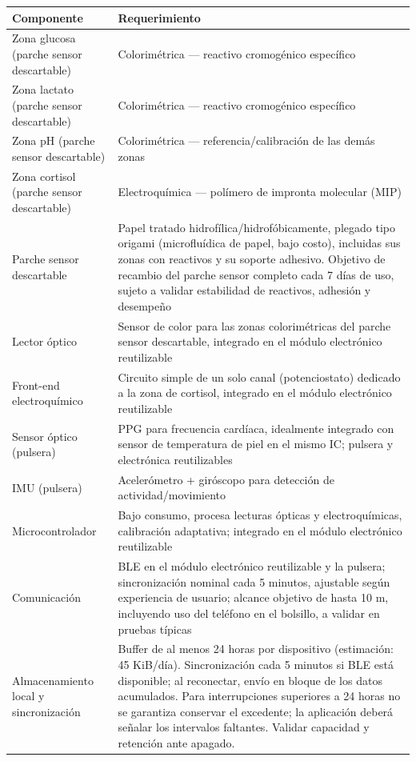 {\small
\renewcommand{\arraystretch}{1.2}
\noindent\begin{tabularx}{\textwidth}{|>{\raggedright\arraybackslash}p{}|>{\raggedright\arraybackslash}X|}
\hline
\textbf{Componente} & \textbf{Requerimiento} \\
\hline
Zona glucosa (parche sensor descartable) & Colorimétrica --- reactivo cromogénico específico \\
\hline
Zona lactato (parche sensor descartable) & Colorimétrica --- reactivo cromogénico específico \\
\hline
Zona pH (parche sensor descartable) & Colorimétrica --- referencia/calibración de las demás zonas \\
\hline
Zona cortisol (parche sensor descartable) & Electroquímica --- polímero de impronta molecular (MIP) \\
\hline
Parche sensor descartable & Papel tratado hidrofílica/hidrofóbicamente, plegado tipo origami (microfluídica de papel, bajo costo), incluidas sus zonas con reactivos y su soporte adhesivo. Objetivo de recambio del parche sensor completo cada 7 días de uso, sujeto a validar estabilidad de reactivos, adhesión y desempeño \\
\hline
Lector óptico & Sensor de color para las zonas colorimétricas del parche sensor descartable, integrado en el módulo electrónico reutilizable \\
\hline
Front-end electroquímico & Circuito simple de un solo canal (potenciostato) dedicado a la zona de cortisol, integrado en el módulo electrónico reutilizable \\
\hline
Sensor óptico (pulsera) & PPG para frecuencia cardíaca, idealmente integrado con sensor de temperatura de piel en el mismo IC; pulsera y electrónica reutilizables \\
\hline
IMU (pulsera) & Acelerómetro + giróscopo para detección de actividad/movimiento \\
\hline
Microcontrolador & Bajo consumo, procesa lecturas ópticas y electroquímicas, calibración adaptativa; integrado en el módulo electrónico reutilizable \\
\hline
Comunicación & BLE en el módulo electrónico reutilizable y la pulsera; sincronización nominal cada 5 minutos, ajustable según experiencia de usuario; alcance objetivo de hasta 10 m, incluyendo uso del teléfono en el bolsillo, a validar en pruebas típicas \\
\hline
Almacenamiento local y sincronización & Buffer de al menos 24 horas por dispositivo (estimación: 45 KiB/día). Sincronización cada 5 minutos si BLE está disponible; al reconectar, envío en bloque de los datos acumulados. Para interrupciones superiores a 24 horas no se garantiza conservar el excedente; la aplicación deberá señalar los intervalos faltantes. Validar capacidad y retención ante apagado. \\

\end{tabularx}}
